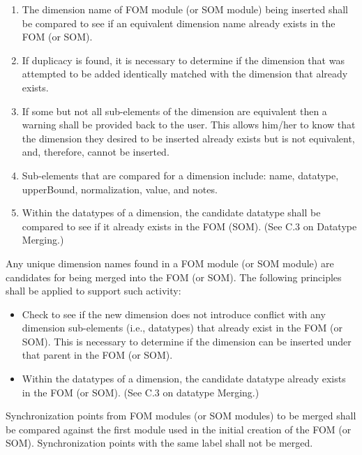\begin{enumerate}[leftmargin=52pt,labelsep=12pt,label=\arabic*),itemsep=0pt,topsep=-2pt,partopsep=0pt,parsep=0pt]
\item The dimension name of FOM module (or SOM module) being inserted shall be compared to see if an equivalent dimension name already exists in the FOM (or SOM).
\item If duplicacy is found, it is necessary to determine if the dimension that was attempted to be added identically matched with the dimension that already exists.
\item If some but not all sub-elements of the dimension are equivalent then a warning shall be provided back to the user. This allows him/her to know that the dimension they desired to be inserted already exists but is not equivalent, and, therefore, cannot be inserted.
\item Sub-elements that are compared for a dimension include: name, datatype, upperBound, normalization, value, and notes.
\item Within the datatypes of a dimension, the candidate datatype shall be compared to see if it already exists in the FOM (SOM). (See C.3 on Datatype Merging.)
\end{enumerate}

\vspace{5pt}Any unique dimension names found in a FOM module (or SOM module) are candidates for being merged into the FOM (or SOM). The following principles shall be applied to support such activity:

\begin{itemize}[leftmargin=54pt,labelsep=12pt,itemsep=0pt,topsep=0.1pt,partopsep=0pt,parsep=0pt]
\item Check to see if the new dimension does not introduce conflict with any dimension sub-elements (i.e., datatypes) that already exist in the FOM (or SOM). This is necessary to determine if the dimension can be inserted under that parent in the FOM (or SOM).
\item Within the datatypes of a dimension, the candidate datatype already exists in the FOM (or SOM). (See C.3 on datatype Merging.)
\end{itemize}
\endgroup

\newpage
\begingroup
\annexcbodyfont
\setlength{\parskip}{12pt plus 1pt minus 1pt}
Synchronization points from FOM modules (or SOM modules) to be merged shall be compared against the first module used in the initial creation of the FOM (or SOM). Synchronization points with the same label shall not be merged.

